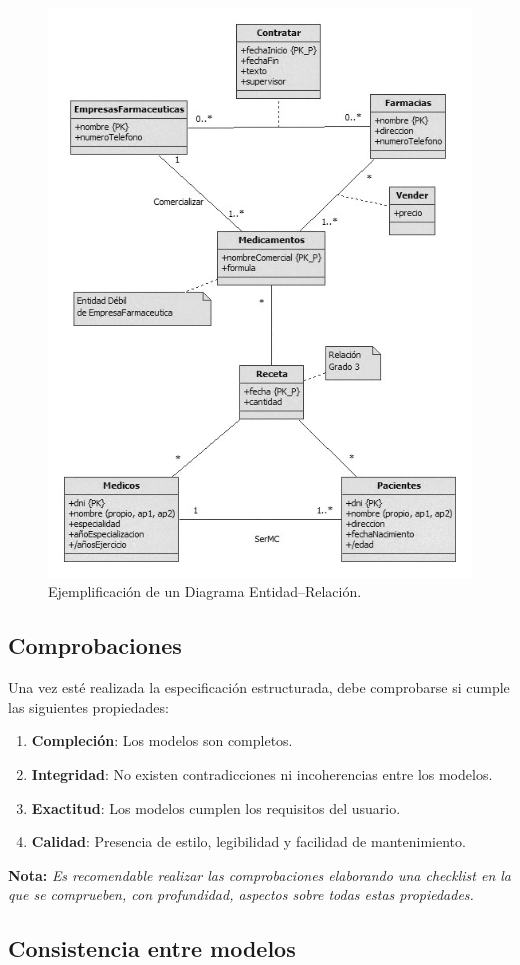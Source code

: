 \begin{figure}[H]
    \centering
    \includegraphics[width=0.6\linewidth]{Resources/Tema5/Caso12_RecetasRayosX_MER.jpg}
    \caption{Ejemplificación de un Diagrama Entidad--Relación.}
\end{figure}

\subsection{Comprobaciones}

Una vez esté realizada la especificación estructurada, debe comprobarse si cumple las siguientes propiedades:

\begin{enumerate}
    \item \textbf{Compleción}: Los modelos son completos.
    \item \textbf{Integridad}: No existen contradicciones ni incoherencias entre los modelos.
    \item \textbf{Exactitud}: Los modelos cumplen los requisitos del usuario.
    \item \textbf{Calidad}: Presencia de estilo, legibilidad y facilidad de mantenimiento.
\end{enumerate}

\textbf{Nota:} \textit{Es recomendable realizar las comprobaciones elaborando una checklist en la que se comprueben, con profundidad, aspectos sobre todas estas propiedades.}

\subsection{Consistencia entre modelos}

